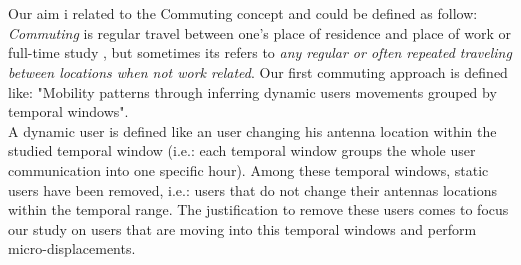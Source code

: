 \\
\\
Our aim i related to the Commuting concept and could be defined as follow: \emph{Commuting} is regular travel between one's place of residence and place of work or full-time study \citep{wiki:commuting}, but  sometimes its refers to \emph{any regular or often repeated traveling between locations when not work related}. Our first commuting approach is defined like: "Mobility patterns through inferring dynamic users movements grouped by temporal windows". 
\\
A dynamic user is defined like an user changing his antenna location within the studied temporal window (i.e.: each temporal window groups the whole user communication into one specific hour). Among these temporal windows, static users have been removed, i.e.: users that do not change their antennas locations within the temporal range. The justification to remove these users comes to focus our study on users that are moving into this temporal windows and perform micro-displacements.
